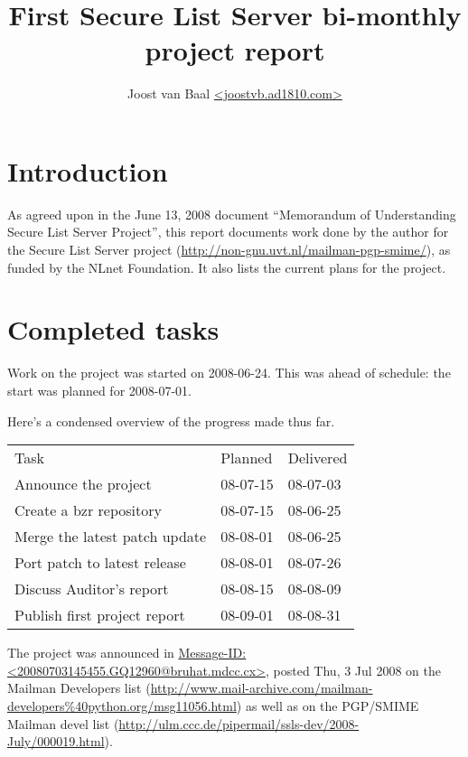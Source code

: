 \documentclass[a4]{article}
\title{First Secure List Server bi-monthly project report}
\author{Joost van Baal \url{<joostvb.ad1810.com>}}
\begin{document}
\maketitle


\setlength{\parindent}{0pt}
\setlength{\parskip}{1.5ex}

\section*{Introduction}

As agreed upon in the June 13, 2008 document ``Memorandum of Understanding
Secure List Server Project'', this report documents work done by the author for
the Secure List Server project
(\url{http://non-gnu.uvt.nl/mailman-pgp-smime/}), as funded by the NLnet
Foundation.  It also lists the current plans for the project.

\section{Completed tasks}

Work on the project was started on 2008-06-24.  This was ahead of schedule:
the start was planned for 2008-07-01.

Here's a condensed overview of the progress made thus far.

\begin{tabular}{lll}
 Task                            & Planned  & Delivered   \\ \cline{1-3}
 Announce the project            & 08-07-15 & 08-07-03    \\
 Create a bzr repository         & 08-07-15 & 08-06-25    \\
 Merge the latest patch update   & 08-08-01 & 08-06-25    \\
 Port patch to latest release    & 08-08-01 & 08-07-26    \\
 Discuss Auditor's report        & 08-08-15 & 08-08-09    \\
 Publish first project report    & 08-09-01 & 08-08-31    \\
\end{tabular}

The project was announced in \url{Message-ID:
<20080703145455.GQ12960@bruhat.mdcc.cx>}, posted Thu, 3 Jul 2008 on the Mailman
Developers list
(\url{http://www.mail-archive.com/mailman-developers%40python.org/msg11056.html})
as well as on the PGP/SMIME Mailman devel list
(\url{http://ulm.ccc.de/pipermail/ssls-dev/2008-July/000019.html}).
\end{document}
